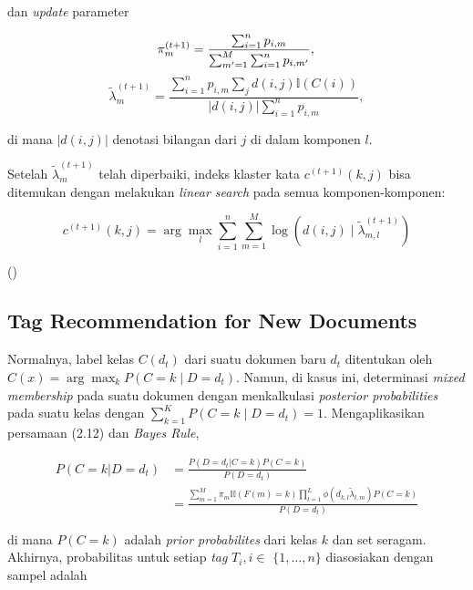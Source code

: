 dan \textit{update} parameter


\begin{equation}
\label{update_parameter_pi}
\pi_{m}^{(t+1)}=\frac{\sum_{i=1}^{n} p_{i, m}}{\sum_{m^{\prime}=1}^{M} \sum_{i=1}^{n} p_{i, m^{\prime}}}, \\ \\ 
\end{equation}
\begin{equation}
\label{update_parameter_lambda}
\tilde{\lambda}_{m}^{(t+1)}=\frac{\sum_{i=1}^{n} p_{i, m} \sum_{j} d(i, j) \mathbb{I}(C(i))}{|d(i, j)| \sum_{i=1}^{n} p_{i, m}},
\end{equation}


di mana $|d(i,j)|$ denotasi bilangan dari $j$ di dalam komponen $l$.

Setelah $\tilde{\lambda}_{m}^{(t+1)}$ telah diperbaiki, indeks klaster kata $c^{(t+1)}(k, j)$ bisa ditemukan dengan melakukan \textit{linear search} pada semua komponen-komponen:

$$
c^{(t+1)}(k, j)=\arg \max _{l} \sum_{i=1}^{n} \sum_{m=1}^{M} \log \left(d(i, j) \mid \tilde{\lambda}_{m, l}^{(t+1)}\right)
$$

(\cite{song2008autotag})

\subsection{Tag Recommendation for New Documents}

Normalnya, label kelas $C(d_{t})$ dari suatu dokumen baru $d_t$ ditentukan oleh $\hat{C}(x)=\arg \max _{k} P\left(C=k \mid D=d_{t}\right)$. Namun, di kasus ini, \cite{song2008autotag} determinasi \textit{mixed membership} pada suatu dokumen dengan menkalkulasi \textit{posterior probabilities} pada suatu kelas dengan $\sum_{k=1}^{K} P\left(C=k \mid D=d_{t}\right)=1$. Mengaplikasikan persamaan (2.12) dan \textit{Bayes Rule},

\begin{equation}
\label{bayes_rules}
    \begin{split}
        P (C = k | D = d_t) 
        &= \frac{P(D = d_t | C = k) P(C=k)}{P(D=d_t)} \\
        &= \frac{\sum_{m=1}^{M} \pi_{m} \mathbb{II}(F(m)=k) \prod_{l=1}^{L} \phi(d_{k, l} \tilde{\lambda}_{l, m}) P(C=k)}{P(D=d_{t})}
    \end{split}
\end{equation}

di mana $P(C = k)$ adalah \textit{prior probabilites} dari kelas $k$ dan set seragam. Akhirnya, probabilitas untuk setiap \textit{tag} $T_{i}, i \in$ $\{1, \ldots, n\}$ diasosiakan dengan sampel adalah


